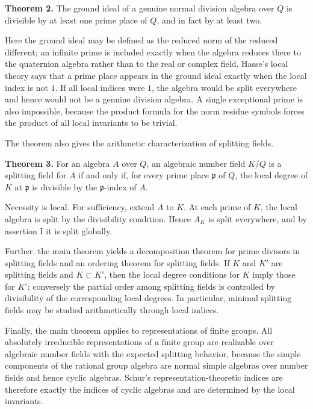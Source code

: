 \documentclass[
  11pt,
]{article}
\begin{document}
\textbf{Theorem 2.} The ground ideal of a genuine normal division
algebra over \(Q\) is divisible by at least one prime place of \(Q\),
and in fact by at least two.

Here the ground ideal may be defined as the reduced norm of the reduced
different; an infinite prime is included exactly when the algebra
reduces there to the quaternion algebra rather than to the real or
complex field. Hasse's local theory says that a prime place appears in
the ground ideal exactly when the local index is not \(1\). If all local
indices were \(1\), the algebra would be split everywhere and hence
would not be a genuine division algebra. A single exceptional prime is
also impossible, because the product formula for the norm residue
symbols forces the product of all local invariants to be trivial.

The theorem also gives the arithmetic characterization of splitting
fields.

\textbf{Theorem 3.} For an algebra \(A\) over \(Q\), an algebraic number
field \(K/Q\) is a splitting field for \(A\) if and only if, for every
prime place \(\mathfrak p\) of \(Q\), the local degree of \(K\) at
\(\mathfrak p\) is divisible by the \(\mathfrak p\)-index of \(A\).

Necessity is local. For sufficiency, extend \(A\) to \(K\). At each
prime of \(K\), the local algebra is split by the divisibility
condition. Hence \(A_K\) is split everywhere, and by assertion I it is
split globally.

Further, the main theorem yields a decomposition theorem for prime
divisors in splitting fields and an ordering theorem for splitting
fields. If \(K\) and \(K'\) are splitting fields and \(K\subset K'\),
then the local degree conditions for \(K\) imply those for \(K'\);
conversely the partial order among splitting fields is controlled by
divisibility of the corresponding local degrees. In particular, minimal
splitting fields may be studied arithmetically through local indices.

Finally, the main theorem applies to representations of finite groups.
All absolutely irreducible representations of a finite group are
realizable over algebraic number fields with the expected splitting
behavior, because the simple components of the rational group algebra
are normal simple algebras over number fields and hence cyclic algebras.
Schur's representation-theoretic indices are therefore exactly the
indices of cyclic algebras and are determined by the local invariants.
\end{document}
